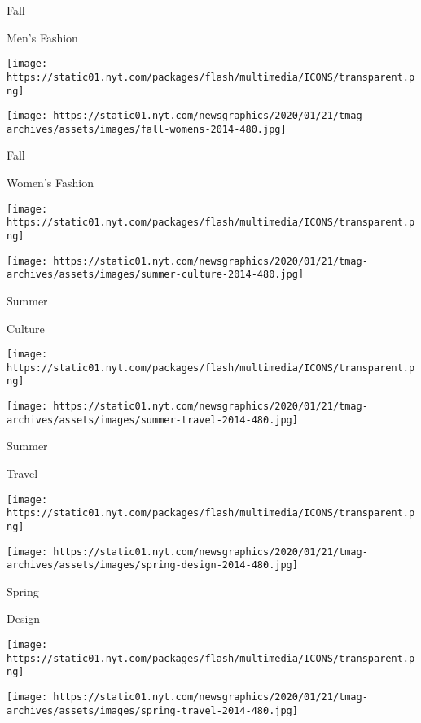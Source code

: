 Fall

Men's Fashion

\href{https://www.nytimes.com/indexes/2014/08/24/t-magazine/womens-fashion-issue/index.html}{}

\texttt{[image: https://static01.nyt.com/packages/flash/multimedia/ICONS/transparent.png]}

\texttt{[image: https://static01.nyt.com/newsgraphics/2020/01/21/tmag-archives/assets/images/fall-womens-2014-480.jpg]}

Fall

Women's Fashion

\href{https://www.nytimes.com/indexes/2014/06/15/t-magazine/design-issue/index.html}{}

\texttt{[image: https://static01.nyt.com/packages/flash/multimedia/ICONS/transparent.png]}

\texttt{[image: https://static01.nyt.com/newsgraphics/2020/01/21/tmag-archives/assets/images/summer-culture-2014-480.jpg]}

Summer

Culture

\href{https://www.nytimes.com/indexes/2014/05/11/t-magazine/travel-issue/index.html}{}

\texttt{[image: https://static01.nyt.com/packages/flash/multimedia/ICONS/transparent.png]}

\texttt{[image: https://static01.nyt.com/newsgraphics/2020/01/21/tmag-archives/assets/images/summer-travel-2014-480.jpg]}

Summer

Travel

\href{https://www.nytimes.com/indexes/2014/06/14/t-magazine/design-issue/index.html}{}

\texttt{[image: https://static01.nyt.com/packages/flash/multimedia/ICONS/transparent.png]}

\texttt{[image: https://static01.nyt.com/newsgraphics/2020/01/21/tmag-archives/assets/images/spring-design-2014-480.jpg]}

Spring

Design

\href{https://www.nytimes.com/indexes/2014/03/23/t-magazine/travel-issue/index.html}{}

\texttt{[image: https://static01.nyt.com/packages/flash/multimedia/ICONS/transparent.png]}

\texttt{[image: https://static01.nyt.com/newsgraphics/2020/01/21/tmag-archives/assets/images/spring-travel-2014-480.jpg]}

